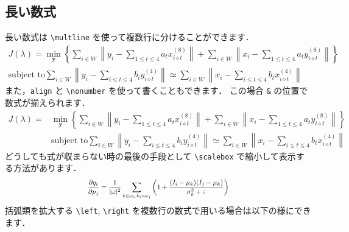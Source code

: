 \documentclass[dvipdfmx,report,disablejfam,nosetpagesize,12pt]{jsbook}
\begin{document}
\subsection{長い数式}
長い数式は \verb+\multline+ を使って複数行に分けることができます．
\begin{multline}
   J(\lambda) = 
   \min_{\bm{y}}
      \left\{
         \sum_{i \in W}
         \left\| y_i - \sum_{1 \le t \le 4} a_t x_{i \diamond t}^{(8)} \right\|
         +
         \sum_{i \in W}
         \left\| x_i - \sum_{1 \le t \le 4} a_t y_{i \diamond t}^{(8)} \right\|
      \right\} 
   \\
   \text{subject to}
      \sum_{i \in W} \left\| y_i - \sum_{i \le t \le 4} b_i y_{i \diamond t}^{(4)} \right\|
      \simeq
      \sum_{i \in W} \left\| x_i - \sum_{i \le t \le 4} b_t x_{i \diamond t}^{(4)} \right\|
   \label{eq:long equation with multline}
\end{multline}
また，\verb+align+ と \verb+\nonumber+ を使って書くこともできます．
この場合 \verb+&+ の位置で数式が揃えられます．
\begin{align}
   J(\lambda) = 
   & \min_{\bm{y}}
      \left\{
         \sum_{i \in W}
         \left\| y_i - \sum_{1 \le t \le 4} a_t x_{i \diamond t}^{(8)} \right\|
         +
         \sum_{i \in W}
         \left\| x_i - \sum_{1 \le t \le 4} a_t y_{i \diamond t}^{(8)} \right\|
      \right\} 
   \nonumber \\
   & \text{subject to}
      \sum_{i \in W} \left\| y_i - \sum_{i \le t \le 4} b_i y_{i \diamond t}^{(4)} \right\|
      \simeq
      \sum_{i \in W} \left\| x_i - \sum_{i \le t \le 4} b_t x_{i \diamond t}^{(4)} \right\|
   \label{eq:long equation with align}
\end{align}
どうしても式が収まらない時の最後の手段として \verb+\scalebox+ で縮小して表示する方法があります．
\begin{equation}
   \scalebox{0.8}{$ \displaystyle
      \frac{\partial q_i}{\partial p_j} =
      \frac{1}{|\omega|^2}
         \sum_{k\in\omega_i,k_in\omega_j}
         \left(
            1 + \frac{(I_i-\mu_k)(I_j-\mu_k)}{\sigma_k^2 + \varepsilon}
         \right)
   $}
\end{equation}
%
括弧類を拡大する \verb+\left+, \verb+\right+ を複数行の数式で用いる場合は以下の様にできます．
\end{document}
